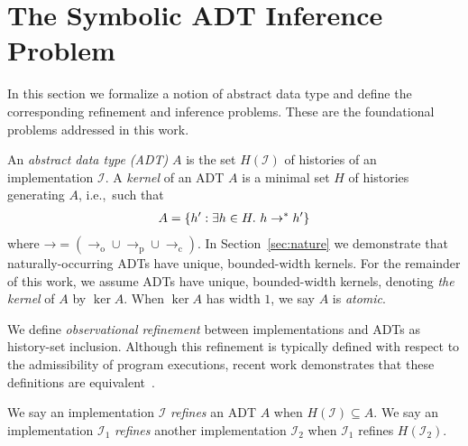 \section{The Symbolic ADT Inference Problem}
\label{sec:inference}

In this section we formalize a notion of abstract data type and define the
corresponding refinement and inference problems. These are the foundational
problems addressed in this work.

An \emph{abstract data type (ADT)} $A$ is the set $H(\mathcal{I})$ of histories
of an implementation $\mathcal{I}$. A \emph{kernel} of an ADT $A$ is a minimal
set $H$ of histories generating $A$, i.e.,~such that
\begin{align*}
  A = {\{{ h' : \exists h \in H.\ h \to^\ast h' }\}}
\end{align*}
where $\mathord\to = (\to_\mathrm{o} \cup \to_\mathrm{p} \cup \to_\mathrm{c})$.
In Section~\ref{sec:nature} we demonstrate that naturally-occurring ADTs have
unique, bounded-width kernels. For the remainder of this work, we assume ADTs
have unique, bounded-width kernels, denoting \emph{the kernel} of $A$ by $\ker
A$. When $\ker A$ has width $1$, we say $A$ is \emph{atomic}.

We define \emph{observational refinement} between implementations and ADTs as
history-set inclusion. Although this refinement is typically defined with
respect to the admissibility of program executions, recent work demonstrates
that these definitions are equivalent~\cite{conf/popl/BouajjaniEEH15}.

\begin{definition}

  We say an implementation $\mathcal{I}$ \emph{refines} an ADT $A$ when
  $H(\mathcal{I}) \subseteq A$. We say an implementation $\mathcal{I}_1$
  \emph{refines} another implementation $\mathcal{I}_2$ when $\mathcal{I}_1$
  refines $H(\mathcal{I}_2)$.

\end{definition}

